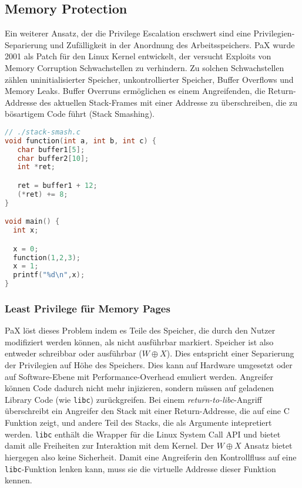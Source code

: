 \subsection{Memory Protection}

Ein weiterer Ansatz, der die Privilege Escalation erschwert sind eine Privilegien-Separierung und Zufälligkeit in der Anordnung des Arbeitsspeichers. PaX wurde 2001 als Patch für den Linux Kernel entwickelt, der versucht Exploits von Memory Corruption Schwachstellen zu verhindern. Zu solchen Schwachstellen zählen uninitialisierter Speicher, unkontrollierter Speicher, Buffer Overflows und Memory Leaks. 
Buffer Overruns ermöglichen es einem Angreifenden, die Return-Addresse des aktuellen Stack-Frames mit einer Addresse zu überschreiben, die zu bösartigem Code führt (Stack Smashing). 

\begin{lstlisting}[language=c,caption={Stack Smashing, das ein Überspringen der \texttt{x = 1} Instruktion bewirkt. Aus \cite{alpeh1996smashing}}]
// ./stack-smash.c
void function(int a, int b, int c) {
   char buffer1[5];
   char buffer2[10];
   int *ret;

   ret = buffer1 + 12;
   (*ret) += 8;
}

void main() {
  int x;

  x = 0;
  function(1,2,3);
  x = 1;
  printf("%d\n",x);
}
\end{lstlisting}


\subsubsection{Least Privilege für Memory Pages}

PaX löst dieses Problem indem es Teile des Speicher, die durch den Nutzer modifiziert werden können, als nicht ausführbar markiert. Speicher ist also entweder schreibbar oder ausführbar ($W \oplus X$). Dies entspricht einer Separierung der Privilegien auf Höhe des Speichers. Dies kann auf Hardware umgesetzt oder auf Software-Ebene mit Performance-Overhead emuliert werden.
Angreifer können Code dadurch nicht mehr injizieren, sondern müssen auf geladenen Library Code (wie \texttt{libc}) zurückgreifen. Bei einem \textit{return-to-libc}-Angriff überschreibt ein Angreifer den Stack mit einer Return-Addresse, die auf eine C Funktion zeigt, und andere Teil des Stacks, die als Argumente intepretiert werden. \texttt{libc} enthält die Wrapper für die Linux System Call API und bietet damit alle Freiheiten zur Interaktion mit dem Kernel. Der $W \oplus X$ Ansatz bietet hiergegen also keine Sicherheit. Damit eine Angreiferin den Kontrollfluss auf eine \texttt{libc}-Funktion lenken kann, muss sie die virtuelle Addresse dieser Funktion kennen.

